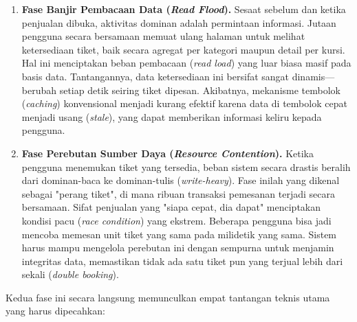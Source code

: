 \begin{enumerate}
    \item \textbf{Fase Banjir Pembacaan Data (\textit{Read Flood}).} Sesaat sebelum dan ketika penjualan dibuka, aktivitas dominan adalah permintaan informasi. Jutaan pengguna secara bersamaan memuat ulang halaman untuk melihat ketersediaan tiket, baik secara agregat per kategori maupun detail per kursi. Hal ini menciptakan beban pembacaan (\textit{read load}) yang luar biasa masif pada basis data. Tantangannya, data ketersediaan ini bersifat sangat dinamis—berubah setiap detik seiring tiket dipesan. Akibatnya, mekanisme tembolok (\textit{caching}) konvensional menjadi kurang efektif karena data di tembolok cepat menjadi usang (\textit{stale}), yang dapat memberikan informasi keliru kepada pengguna.

    \item \textbf{Fase Perebutan Sumber Daya (\textit{Resource Contention}).} Ketika pengguna menemukan tiket yang tersedia, beban sistem secara drastis beralih dari dominan-baca ke dominan-tulis (\textit{write-heavy}). Fase inilah yang dikenal sebagai "perang tiket", di mana ribuan transaksi pemesanan terjadi secara bersamaan. Sifat penjualan yang "siapa cepat, dia dapat" menciptakan kondisi pacu (\textit{race condition}) yang ekstrem. Beberapa pengguna bisa jadi mencoba memesan unit tiket yang sama pada milidetik yang sama. Sistem harus mampu mengelola perebutan ini dengan sempurna untuk menjamin integritas data, memastikan tidak ada satu tiket pun yang terjual lebih dari sekali (\textit{double booking}).
\end{enumerate}

Kedua fase ini secara langsung memunculkan empat tantangan teknis utama yang harus dipecahkan:

